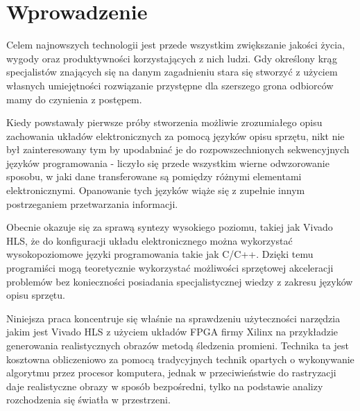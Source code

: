 \chapter*{Wprowadzenie}
{

\pagestyle{empty}
\pagestyle{fancy}
\fancyhead{} %
\fancyhead[RO,LE]{\thepage}

Celem najnowszych technologii jest przede wszystkim zwiększanie jakości życia, wygody oraz produktywności korzystających z nich ludzi. Gdy określony krąg specjalistów znających się na danym zagadnieniu stara się stworzyć z użyciem własnych umiejętności rozwiązanie przystępne dla szerszego grona odbiorców mamy do czynienia z postępem.

Kiedy powstawały pierwsze próby stworzenia możliwie zrozumiałego opisu zachowania układów elektronicznych za pomocą języków opisu sprzętu, nikt nie był zainteresowany tym by upodabniać je do rozpowszechnionych sekwencyjnych języków programowania - liczyło się przede wszystkim wierne odwzorowanie sposobu, w jaki dane transferowane są pomiędzy różnymi elementami elektronicznymi. Opanowanie tych języków wiąże się z zupełnie innym postrzeganiem przetwarzania informacji. 

Obecnie okazuje się za sprawą syntezy wysokiego poziomu, takiej jak Vivado HLS, że do konfiguracji układu elektronicznego można wykorzystać wysokopoziomowe języki programowania takie jak C/C++. Dzięki temu programiści mogą teoretycznie wykorzystać możliwości sprzętowej akceleracji problemów bez konieczności posiadania specjalistycznej wiedzy z zakresu języków opisu sprzętu.

Niniejsza praca koncentruje się właśnie na sprawdzeniu użyteczności narzędzia jakim jest Vivado HLS z użyciem układów FPGA firmy Xilinx na przykładzie generowania realistycznych obrazów metodą śledzenia promieni. Technika ta jest kosztowna obliczeniowo za pomocą tradycyjnych technik opartych o wykonywanie algorytmu przez procesor komputera, jednak w przeciwieństwie do rastryzacji daje realistyczne obrazy w sposób bezpośredni, tylko na podstawie analizy rozchodzenia się światła w przestrzeni.

}
